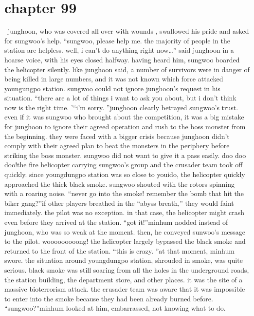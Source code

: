 \section{chapter 99}






 junghoon, who was covered all over with wounds , swallowed his pride and asked for sungwoo’s help.
“sungwoo, please help me.
 the majority of people in the station are helpless.
 well, i can’t do anything right now…” said junghoon in a hoarse voice, with his eyes closed halfway.
having heard him, sungwoo boarded the helicopter silently.
like junghoon said, a number of survivors were in danger of being killed in large numbers, and it was not known which force attacked youngungpo station.
 sungwoo could not ignore junghoon’s request in his situation.
“there are a lot of things i want to ask you about, but i don’t think now is the right time.
’“i’m sorry.
”junghoon clearly betrayed sungwoo’s trust.
 even if it was sungwoo who brought about the competition, it was a big mistake for junghoon to ignore their agreed operation and rush to the boss monster from the beginning.
they were faced with a bigger crisis because junghoon didn’t comply with their agreed plan to beat the monsters in the periphery before striking the boss monster.
sungwoo did not want to give it a pass easily.
doo doo doo!the fire helicopter carrying sungwoo’s group and the crusader team took off quickly.
since youngdungpo station was so close to youido, the helicopter quickly approached the thick black smoke.
sungwoo shouted with the rotors spinning with a roaring noise.
“never go into the smoke! remember the bomb that hit the biker gang?”if other players breathed in the “abyss breath,” they would faint immediately.
 the pilot was no exception.
 in that case, the helicopter might crash even before they arrived at the station.
“got it!”minhum nodded instead of junghoon, who was so weak at the moment.
then, he conveyed sunwoo’s message to the pilot.
wooooooooong!
the helicopter largely bypassed the black smoke and returned to the front of the station.
“this is crazy.
”at that moment, minhum swore.
 the situation around youngdungpo station, shrouded in smoke, was quite serious.
black smoke was still soaring from all the holes in the underground roads, the station building, the department store, and other places.
 it was the site of a massive bioterrorism attack.
the crusader team was aware that it was impossible to enter into the smoke because they had been already burned before.
“sungwoo?”minhum looked at him, embarrassed, not knowing what to do.

